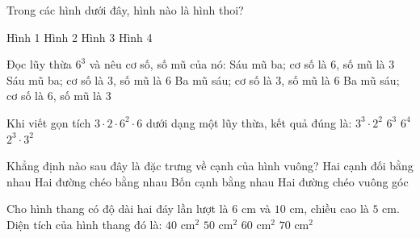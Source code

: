 \documentclass[12pt,a4paper]{article}
\begin{document}
\begin{ex}
Trong các hình dưới đây, hình nào là hình thoi?\begin{center}\end{center}
\choice
{Hình 1}
{\True Hình 2}
{Hình 3}
{Hình 4}
\end{ex}

\begin{ex}
Đọc lũy thừa $6^3$ và nêu cơ số, số mũ của nó:
\choice
{\True Sáu mũ ba; cơ số là $6$, số mũ là $3$}
{Sáu mũ ba; cơ số là $3$, số mũ là $6$}
{Ba mũ sáu; cơ số là $3$, số mũ là $6$}
{Ba mũ sáu; cơ số là $6$, số mũ là $3$}
\end{ex}

\begin{ex}
Khi viết gọn tích $3 \cdot 2 \cdot 6^2 \cdot 6$ dưới dạng một lũy thừa, kết quả đúng là:
\choice
{$3^3 \cdot 2^2$}
{$6^3$}
{\True $6^4$}
{$2^3 \cdot 3^2$}
\end{ex}

\begin{ex}
Khẳng định nào sau đây là đặc trưng về cạnh của hình vuông?
\choice
{Hai cạnh đối bằng nhau}
{Hai đường chéo bằng nhau}
{\True Bốn cạnh bằng nhau}
{Hai đường chéo vuông góc}
\end{ex}

\begin{ex}
Cho hình thang có độ dài hai đáy lần lượt là $6\text{ cm}$ và $10\text{ cm}$, chiều cao là $5\text{ cm}$. Diện tích của hình thang đó là:
\choice
{\True $40\text{ cm}^2$}
{$50\text{ cm}^2$}
{$60\text{ cm}^2$}
{$70\text{ cm}^2$}
\end{ex}
\end{document}
